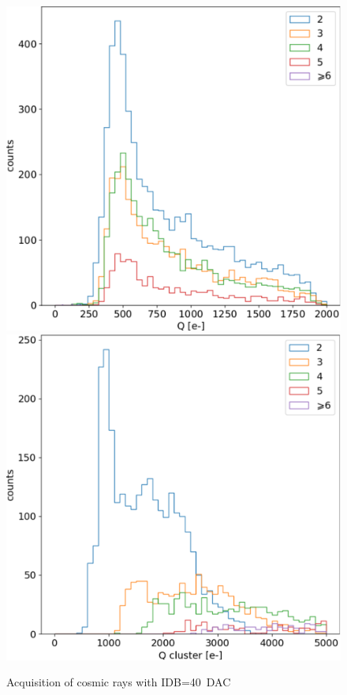         \begin{figure}[h!]
            \centering
            \includegraphics[width=.49\linewidth]{figures/charaterization/cosmic_rays_spectrum_per_pixel.pdf}
            \includegraphics[width=.49\linewidth]{figures/charaterization/cosmic_rays_spectrum_cluster.pdf}
            \caption{Acquisition of cosmic rays with IDB=\SI{40}{DAC}}
            \label{fig:spectrum_cosmic_rays}
        \end{figure}   
